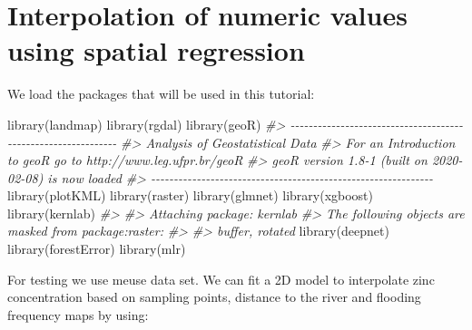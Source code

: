 \documentclass[
  graybox,natbib,nospthms]{svmono}
\newenvironment{Shaded}{\begin{snugshade}}{\end{snugshade}}
\newcommand{\CommentTok}[1]{\textcolor[rgb]{0.37,0.37,0.37}{\textit{#1}}}
\newcommand{\FunctionTok}[1]{\textcolor[rgb]{0,0,0}{#1}}
\newcommand{\NormalTok}[1]{#1}
\begin{document}
\hypertarget{interpolation-of-numeric-values-using-spatial-regression}{%
\section{Interpolation of numeric values using spatial regression}\label{interpolation-of-numeric-values-using-spatial-regression}}

We load the packages that will be used in this tutorial:

\begin{Shaded}
\begin{Highlighting}[]
\FunctionTok{library}\NormalTok{(landmap)}
\FunctionTok{library}\NormalTok{(rgdal)}
\FunctionTok{library}\NormalTok{(geoR)}
\CommentTok{\#\textgreater{} {-}{-}{-}{-}{-}{-}{-}{-}{-}{-}{-}{-}{-}{-}{-}{-}{-}{-}{-}{-}{-}{-}{-}{-}{-}{-}{-}{-}{-}{-}{-}{-}{-}{-}{-}{-}{-}{-}{-}{-}{-}{-}{-}{-}{-}{-}{-}{-}{-}{-}{-}{-}{-}{-}{-}{-}{-}{-}{-}{-}{-}{-}}
\CommentTok{\#\textgreater{}  Analysis of Geostatistical Data}
\CommentTok{\#\textgreater{}  For an Introduction to geoR go to http://www.leg.ufpr.br/geoR}
\CommentTok{\#\textgreater{}  geoR version 1.8{-}1 (built on 2020{-}02{-}08) is now loaded}
\CommentTok{\#\textgreater{} {-}{-}{-}{-}{-}{-}{-}{-}{-}{-}{-}{-}{-}{-}{-}{-}{-}{-}{-}{-}{-}{-}{-}{-}{-}{-}{-}{-}{-}{-}{-}{-}{-}{-}{-}{-}{-}{-}{-}{-}{-}{-}{-}{-}{-}{-}{-}{-}{-}{-}{-}{-}{-}{-}{-}{-}{-}{-}{-}{-}{-}{-}}
\FunctionTok{library}\NormalTok{(plotKML)}
\FunctionTok{library}\NormalTok{(raster)}
\FunctionTok{library}\NormalTok{(glmnet)}
\FunctionTok{library}\NormalTok{(xgboost)}
\FunctionTok{library}\NormalTok{(kernlab)}
\CommentTok{\#\textgreater{} }
\CommentTok{\#\textgreater{} Attaching package: \textquotesingle{}kernlab\textquotesingle{}}
\CommentTok{\#\textgreater{} The following objects are masked from \textquotesingle{}package:raster\textquotesingle{}:}
\CommentTok{\#\textgreater{} }
\CommentTok{\#\textgreater{}     buffer, rotated}
\FunctionTok{library}\NormalTok{(deepnet)}
\FunctionTok{library}\NormalTok{(forestError)}
\FunctionTok{library}\NormalTok{(mlr)}
\end{Highlighting}
\end{Shaded}

For testing we use meuse data set. We can fit a 2D model to interpolate zinc
concentration based on sampling points, distance to the river and flooding frequency
maps by using:
\end{document}
